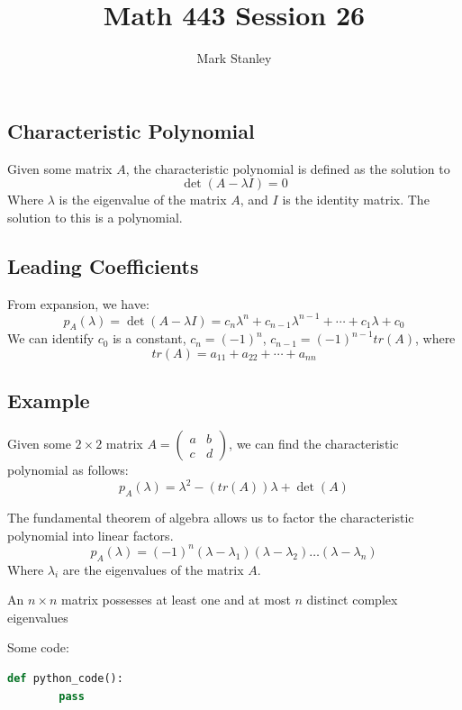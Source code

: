 \documentclass[11pt]{article}
\author{Mark Stanley}
\title{Math 443 Session 26}
\begin{document}
    \lstset{style=mystyle}

    \maketitle

    \subsection{Characteristic Polynomial}
    Given some matrix $A$, the characteristic polynomial is defined as the solution to
    \[\det(A-\lambda I)=0\]
    Where $\lambda$ is the eigenvalue of the matrix $A$, and $I$ is the identity matrix.
    The solution to this is a polynomial.

    \subsection{Leading Coefficients}
    From expansion, we have:
    \[p_A(\lambda) = \det(A-\lambda I)=c_n \lambda^n + c_{n-1}\lambda^{n-1}+\cdots+c_1\lambda + c_0\]
    We can identify $c_0$ is a constant, $c_n=(-1)^n$, $c_{n-1}=(-1)^{n-1} tr(A)$, where
    \[tr(A)=a_{11}+a_{22} + \cdots + a_{nn}\]

    \subsection{Example}
    Given some $2 \times 2$ matrix $A=\begin{pmatrix} a & b \\ c & d \end{pmatrix}$, we can find the characteristic polynomial as follows:
    \[p_A(\lambda)=\lambda^2 - (tr(A))\lambda + \det(A)\]

    The fundamental theorem of algebra allows us to factor the characteristic polynomial into linear factors.
    \[p_A(\lambda)=(-1)^n(\lambda-\lambda_1)(\lambda-\lambda_2)\ldots(\lambda-\lambda_n)\]
    Where $\lambda_i$ are the eigenvalues of the matrix $A$.

    An $n \times n$ matrix possesses at least one and at most $n$ distinct complex eigenvalues

    Some code:
    \begin{lstlisting}[language=Python]
    def python_code():
        pass
    \end{lstlisting}
\end{document}

